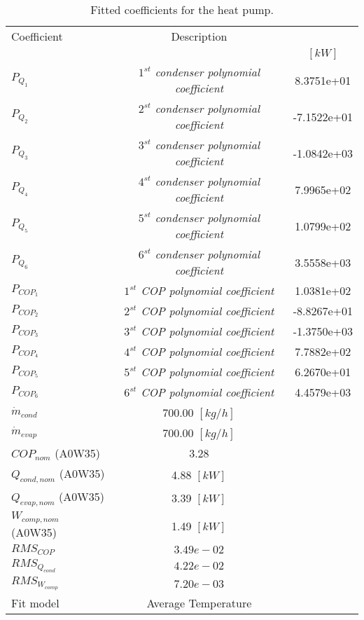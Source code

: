 \documentclass[english]{SPFShortReport}
\author{Dani Carbonell}
\begin{document}
\begin{table}[!ht]
\begin{small}
\caption{Fitted coefficients for the heat pump.}
\begin{center}
\resizebox{12cm}{!} 
{
\begin{tabular}{l | c c } 
\hline
\hline
Coefficient &Description & \\ 
 & &$[kW]$\\ 
\hline
$P_{Q_{1}}$ & \emph{$1^{st}$ condenser polynomial coefficient}  & 8.3751e+01    \\ 
$P_{Q_{2}}$ & \emph{$2^{st}$ condenser polynomial coefficient}  & -7.1522e+01    \\ 
$P_{Q_{3}}$ & \emph{$3^{st}$ condenser polynomial coefficient}  & -1.0842e+03    \\ 
$P_{Q_{4}}$ & \emph{$4^{st}$ condenser polynomial coefficient}  & 7.9965e+02    \\ 
$P_{Q_{5}}$ & \emph{$5^{st}$ condenser polynomial coefficient}  & 1.0799e+02    \\ 
$P_{Q_{6}}$ & \emph{$6^{st}$ condenser polynomial coefficient}  & 3.5558e+03    \\ 
\hline
$P_{COP_{1}}$ & \emph{$1^{st}$ COP polynomial coefficient}  & 1.0381e+02    \\ 
$P_{COP_{2}}$ & \emph{$2^{st}$ COP polynomial coefficient}  & -8.8267e+01    \\ 
$P_{COP_{3}}$ & \emph{$3^{st}$ COP polynomial coefficient}  & -1.3750e+03    \\ 
$P_{COP_{4}}$ & \emph{$4^{st}$ COP polynomial coefficient}  & 7.7882e+02    \\ 
$P_{COP_{5}}$ & \emph{$5^{st}$ COP polynomial coefficient}  & 6.2670e+01    \\ 
$P_{COP_{6}}$ & \emph{$6^{st}$ COP polynomial coefficient}  & 4.4579e+03    \\ 
\hline
$\dot m_{cond}$ & 700.00 $[kg/h]$ \\ 
$\dot m_{evap}$ & 700.00 $[kg/h]$ \\ 
\hline
$COP_{nom}$ (A0W35)& 3.28 \\ 
$Q_{cond,nom}$ (A0W35)& 4.88 $[kW]$\\ 
$Q_{evap,nom}$ (A0W35)& 3.39 $[kW]$\\ 
$W_{comp,nom}$ (A0W35)& 1.49 $[kW]$\\ 
\hline
 $RMS_{COP}$ & $3.49e-02$ \\ 
 $RMS_{Q_{cond}}$ & $4.22e-02$ \\ 
 $RMS_{W_{comp}}$ & $7.20e-03$ \\ 
\hline
Fit model & Average Temperature\\ 
\hline
\hline
\end{tabular}
}
\label{CoefTable}
\end{center}
\end{small}
\end{table}
\end{document}
